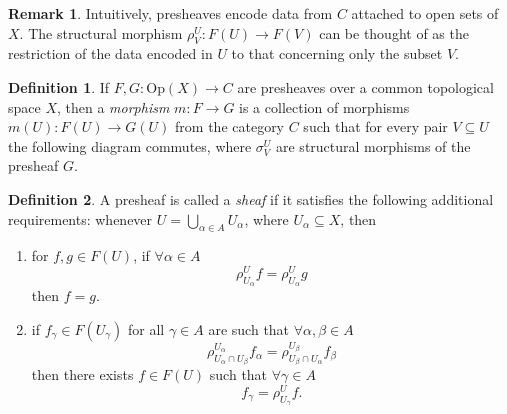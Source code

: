 \documentclass{article}
\theoremstyle{definition}
\newtheorem{definition}{Definition}
\newtheorem*{remark}{Remark}
\begin{document}
\begin{remark}
    Intuitively, presheaves encode data from $C$ attached to open sets of $X$. The structural morphism $\rho_V^U: F(U) \rightarrow F(V)$ can be thought of as the restriction of the data encoded in $U$ to that concerning only the subset $V$.
\end{remark}

\begin{definition}
    If $F, G: \text{Op}(X) \rightarrow C$ are presheaves over a common topological space $X$, then a \emph{morphism} $m: F \rightarrow G$ is a collection of morphisms $m(U): F(U) \rightarrow G(U)$ from the category $C$ such that for every pair $V \subseteq U$ the following diagram commutes, where $\sigma_V^U$ are structural morphisms of the presheaf $G$.
\end{definition}

\begin{figure}[ht]
    \centering
\end{figure}

\begin{definition}
    \label{def:sheaf}
    A presheaf is called a \emph{sheaf} if it satisfies the following additional requirements: whenever $U = \bigcup_{\alpha \in A} U_\alpha$, where $U_\alpha \subseteq X$, then
    
    \begin{enumerate}
        \item for $f, g \in F(U)$, if $\forall \alpha \in A$
        \begin{equation*}
            \rho_{U_\alpha}^U f = \rho_{U_\alpha}^U g
        \end{equation*}
        then $f = g$.
        \item if $f_\gamma \in F(U_\gamma)$ for all $\gamma \in A$ are such that $\forall \alpha, \beta \in A$
        \begin{equation*}
            \rho_{U_\alpha \cap U_\beta}^{U_\alpha} f_\alpha
            = \rho_{U_\beta \cap U_\alpha}^{U_\beta} f_\beta
        \end{equation*}
        then there exists $f \in F(U)$ such that $\forall \gamma \in A$
        \begin{equation*}
            f_\gamma = \rho_{U_\gamma}^U f.
        \end{equation*}
    \end{enumerate}
\end{definition}
\end{document}
